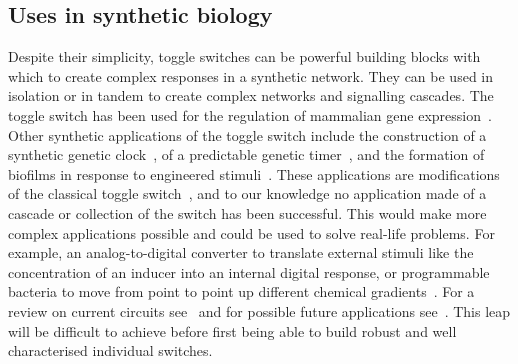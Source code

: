 \subsection{Uses in synthetic biology}
Despite their simplicity, toggle switches can be powerful building blocks with which to create complex responses in a synthetic network. They can be used in isolation or in tandem to create complex networks and signalling cascades. The toggle switch has been used for the regulation of mammalian gene expression~\autocite{Deans:2007cya, Kramer:2004kq}. Other synthetic applications of the toggle switch include the construction of a synthetic genetic clock~\autocite{Atkinson:2003tu}, of a predictable genetic timer~\autocite{Ellis:2009hka}, and the formation of biofilms in response to engineered stimuli~\autocite{Kobayashi:2004cv}. These applications are modifications of the classical toggle switch~\autocite{Gardner:2000vha}, and to our knowledge no application made of a cascade or collection of the switch has been successful. This would make more complex applications possible and could be used to solve real-life problems. For example, an analog-to-digital converter to translate external stimuli like the concentration of an inducer into an internal digital response, or programmable bacteria to move from point to point up different chemical gradients~\autocite{Lu:2009ez}. For a review on current circuits see~\autocite{Khalil:2010hm} and for possible future applications see~\autocite{Lu:2009ez}. This leap will be difficult to achieve before first being able to build robust and well characterised individual switches.


